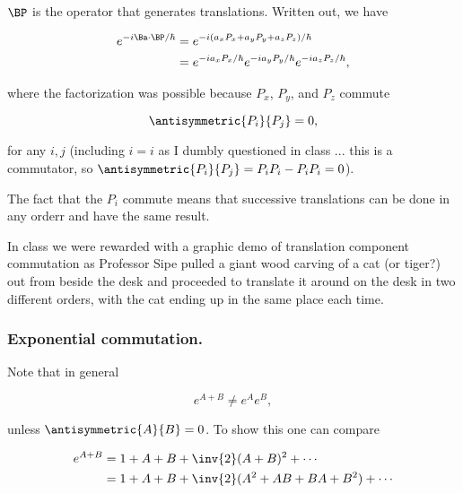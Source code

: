 $\BP$ is the operator that generates translations.  Written out, we have

\begin{equation}\label{eqn:qmTwoL11:50}
\begin{aligned}
e^{-i \Ba \cdot \BP/\hbar} 
&= e^{- i (a_x P_x + a_y P_y + a_z P_z)/\hbar} \\
&= e^{- i a_x P_x/\hbar}
e^{- i a_y P_y/\hbar}
e^{- i a_z P_z/\hbar},
\end{aligned}
\end{equation}

where the factorization was possible because $P_x$, $P_y$, and $P_z$ commute

\begin{equation}\label{eqn:qmTwoL11:70}
\antisymmetric{P_i}{P_j} = 0,
\end{equation}

for any $i, j$ (including $i = i$ as I dumbly questioned in class ... this is a  commutator, so $\antisymmetric{P_i}{P_j} = P_i P_i - P_i P_i = 0$).

The fact that the $P_i$ commute means that successive translations can be done in any orderr and have the same result.

In class we were rewarded with a graphic demo of translation component commutation as Professor Sipe pulled a giant wood carving of a cat (or tiger?) out from beside the desk and proceeded to translate it around on the desk in two different orders, with the cat ending up in the same place each time.

\subsubsection{Exponential commutation.}

Note that in general

\begin{equation}\label{eqn:qmTwoL11:90}
e^{A + B} \ne e^A e^B,
\end{equation}

unless $\antisymmetric{A}{B} = 0$.  To show this one can compare

\begin{equation}\label{eqn:qmTwoL11:110}
\begin{aligned}
e^{A + B} 
&= 1 + A + B + \inv{2}(A + B)^2 + \cdots \\
&= 1 + A + B + \inv{2}(A^2 + A B + BA + B^2) + \cdots \\
\end{aligned}
\end{equation}

